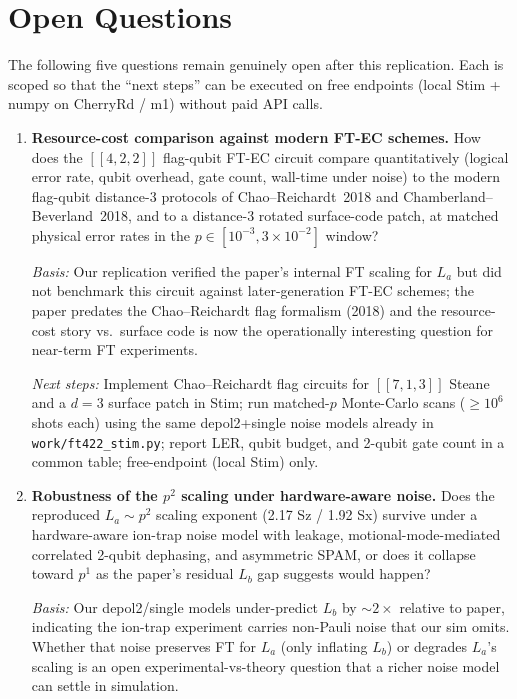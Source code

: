 \section{Open Questions}

The following five questions remain genuinely open after this replication.
Each is scoped so that the ``next steps'' can be executed on free
endpoints (local Stim + numpy on CherryRd / m1) without paid API calls.

\begin{enumerate}
\item \textbf{Resource-cost comparison against modern FT-EC schemes.}
How does the $[\![4,2,2]\!]$ flag-qubit FT-EC circuit compare
quantitatively (logical error rate, qubit overhead, gate count, wall-time
under noise) to the modern flag-qubit distance-3 protocols of
Chao--Reichardt~2018 and Chamberland--Beverland~2018, and to a
distance-3 rotated surface-code patch, at matched physical error rates in
the $p \in [10^{-3}, 3\!\times\!10^{-2}]$ window?

\emph{Basis:} Our replication verified the paper's internal FT scaling
for $L_a$ but did not benchmark this circuit against later-generation
FT-EC schemes; the paper predates the Chao--Reichardt flag formalism
(2018) and the resource-cost story vs.\ surface code is now the
operationally interesting question for near-term FT experiments.

\emph{Next steps:} Implement Chao--Reichardt flag circuits for
$[\![7,1,3]\!]$ Steane and a $d=3$ surface patch in Stim; run matched-$p$
Monte-Carlo scans ($\geq 10^6$ shots each) using the same
depol2+single noise models already in \texttt{work/ft422\_stim.py}; report
LER, qubit budget, and 2-qubit gate count in a common table; free-endpoint
(local Stim) only.

\item \textbf{Robustness of the $p^2$ scaling under hardware-aware noise.}
Does the reproduced $L_a \sim p^2$ scaling exponent
(2.17 Sz / 1.92 Sx) survive under a hardware-aware ion-trap noise model
with leakage, motional-mode-mediated correlated 2-qubit dephasing, and
asymmetric SPAM, or does it collapse toward $p^1$ as the paper's residual
$L_b$ gap suggests would happen?

\emph{Basis:} Our depol2/single models under-predict $L_b$ by
${\sim}2\times$ relative to paper, indicating the ion-trap experiment
carries non-Pauli noise that our sim omits. Whether that noise preserves
FT for $L_a$ (only inflating $L_b$) or degrades $L_a$'s scaling is an open
experimental-vs-theory question that a richer noise model can settle in
simulation.


\end{enumerate}
